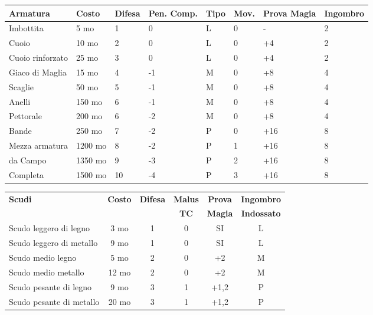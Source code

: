 \documentclass[landscape,10pt,a4paper]{article}
\begin{document}
\begin{multicols}{2}
\begin{dmbox}[title=Armature - pagina \pageref{equipaggiamentoarmature}]
\noindent\begin{tabular}{llllllll}
	\textbf{Armatura} & \textbf{Costo} & \textbf{Difesa} & \textbf{Pen. Comp.} & \textbf{Tipo} & \textbf{Mov.} & \textbf{Prova Magia}&\textbf{Ingombro}\\
	\toprule
	Imbottita & 5 mo & 1 & 0 & L 	& 		0 		& -		&2\\
	Cuoio & 10 mo & 2 & 0 & L 		& 		0 		& +4		&2\\
	Cuoio rinforzato& 25 mo& 3 & 0& L 	& 0 		& +4		&2\\
	Giaco di Maglia & 15 mo & 4 & -1 & M & 0 		&+8			&4\\
	Scaglie& 50 mo & 5& -1& M & 0 					&+8			&4\\
	Anelli & 150 mo & 6& -1& M & 0 					&+8			&4\\
	Pettorale& 200 mo & 6& -2& M & 0 				&+8			&4\\
	Bande & 250 mo & 7& -2& P & 0 					&+16		&8\\
	Mezza armatura& 1200 mo& 8& -2& P & 1 			&+16		&8\\
	da Campo& 1350 mo& 9& -3& P & 2 				&+16		&8\\
	Completa& 1500 mo& 10 & -4& P & 3 				&+16		&8
\end{tabular}

\end{dmbox}

\begin{dmbox}[title=Scudi - pagina \pageref{tabella-scudi}]
\begin{tabular}{lccccc}
\textbf{Scudi} & \textbf{Costo} & \textbf{Difesa} & \textbf{Malus} & \textbf{Prova} &  \textbf{Ingombro}\\
&&&\textbf{TC}&\textbf{Magia}&\textbf{Indossato}\\
\hline
Scudo leggero di legno  & 3 mo  &  1& 0& SI  & L\\
Scudo leggero di metallo & 9 mo  &  1& 0& SI  & L\\
Scudo medio legno &5 mo &  2& 0& +2& M\\
Scudo medio metallo  &12 mo  &  2  & 0& +2  & M\\
Scudo pesante di legno   & 9  mo  &  3 & 1& +1,2  & P\\
Scudo pesante di metallo & 20 mo  &  3& 1& +1,2  & P\\
\end{tabular}
\end{dmbox}


\end{multicols}
\end{document}

